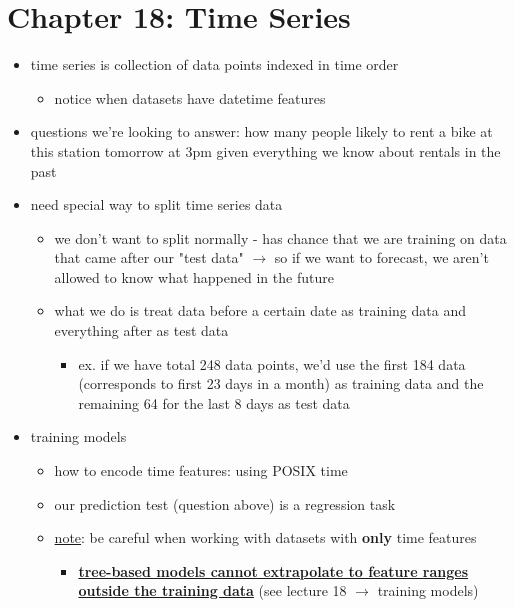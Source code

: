\documentclass[10.5pt,a4paper, fleqn, dvipsnames]{article}
\makeatletter
\newcommand*{\sectionbookmark}[1][]{%
  \bookmark[%
    level=section,%
    dest=\@currentHref,%
    #1%
  ]%
}
\makeatother
\begin{document}
\section*{Chapter 18: Time Series}
\sectionbookmark{Chapter 18: Time Series}
\begin{itemize}
    \item time series is collection of data points indexed in time order 
    \begin{itemize}
        \item notice when datasets have datetime features
    \end{itemize}
    \item questions we're looking to answer: how many people likely to rent a bike at this station tomorrow at 3pm given everything we know about rentals in the past 
    \item need special way to split time series data
    \begin{itemize}
        \item we don't want to split normally - has chance that we are training on data that came after our "test data" $\rightarrow$ so if we want to forecast, we aren't allowed to know what happened in the future
        \item what we do is treat data before a certain date as training data and everything after as test data
        \begin{itemize}[leftmargin = 2em]
            \item ex. if we have total 248 data points, we'd use the first 184 data (corresponds to first 23 days in a month) as training data and the remaining 64 for the last 8 days as test data
        \end{itemize}
    \end{itemize}
    \item training models
    \begin{itemize}
        \item how to encode time features: using POSIX time 
        \item our prediction test (question above) is a regression task 
        \item \ul{note}: be careful when working with datasets with \textbf{only} time features
        \begin{itemize}[leftmargin = 2em]
            \item \textbf{\ul{tree-based models cannot extrapolate to feature ranges outside the training data}} (see lecture 18 $\rightarrow$ training models)
        \end{itemize}

\end{itemize}
\end{itemize}
\end{document}

